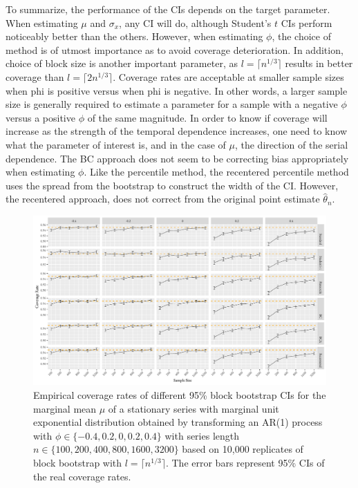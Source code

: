 \documentclass[10pt]{article}
\begin{document}
To summarize, the performance of the CIs depends on the target parameter. When
estimating $\mu$ and $\sigma_x$, any CI will do, although Student's $t$ CIs
perform noticeably better than the others.
However, when estimating $\phi$, the 
choice of method is of utmost importance as to avoid coverage deterioration. 
In addition, choice of block size is another important parameter, as
$l = \lceil n^{1/3} \rceil$ results in better coverage than 
$l = \lceil 2n^{1/3} \rceil$.
Coverage rates are acceptable at smaller sample 
sizes when phi is positive versus when phi is negative. In
other words, a larger sample size is generally required to estimate a 
parameter for a sample with a negative $\phi$ versus a positive $\phi$ of the 
same magnitude. In order 
to know if coverage will increase as the strength of the temporal dependence 
increases, one need to know what the parameter of interest is, and in the case 
of $\mu$, the direction of the serial dependence. The BC approach does not seem 
to be correcting bias appropriately when estimating $\phi$. Like the percentile 
method, the recentered percentile method uses the spread from the bootstrap to 
construct the width of the CI. However, the recentered approach, does not 
correct from the original point estimate $\hat\theta_n$.


\begin{figure}[tbp]
  \centering
  \includegraphics[width=\textwidth]{figures/plot_exp_mu_1}
  \caption{Empirical coverage rates of different 95\% block bootstrap CIs for
    the marginal mean $\mu$ of a stationary series with marginal unit exponential
    distribution obtained by transforming an AR(1) process with
    $\phi \in \{-0.4, 0.2, 0, 0.2, 0.4\}$ with series length
    $n \in \{100, 200, 400, 800, 1600, 3200\}$ based on 10,000 replicates of
    block bootstrap with $l = \lceil n^{1/3} \rceil$. 
    The error bars represent 95\% CIs of the real coverage rates.}
  \label{fig:exp_mu1}
\end{figure}
\end{document}
